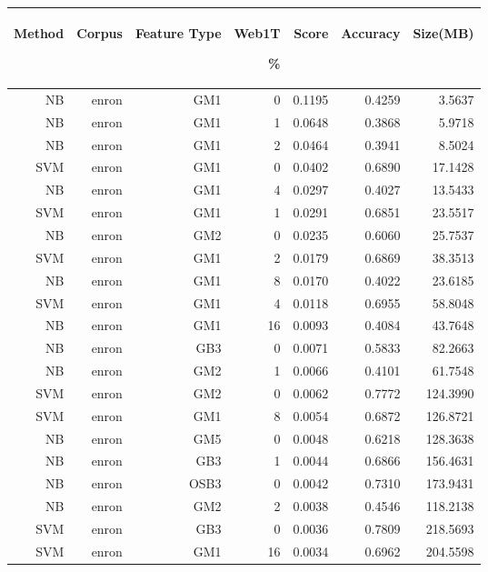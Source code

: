 \begin{table}[htbp!]
	\begin{center}
		\begin{tabular}{ | r | r | r | r | r | r | r | }
			\hline
			\begin{sideways}Method\end{sideways} & \begin{sideways}Corpus\end{sideways} & \begin{sideways}Feature Type\end{sideways} & \begin{sideways}Web1T\end{sideways} \% & \begin{sideways}Score\end{sideways} & \begin{sideways}Accuracy\end{sideways} & \begin{sideways}Size(MB)\end{sideways}\\ \hline 

			NB	& enron	& GM1	& 0	& 0.1195	& 0.4259	& 3.5637\\ \hline 
			NB	& enron	& GM1	& 1	& 0.0648	& 0.3868	& 5.9718\\ \hline 
			NB	& enron	& GM1	& 2	& 0.0464	& 0.3941	& 8.5024\\ \hline 
			SVM	& enron	& GM1	& 0	& 0.0402	& 0.6890	& 17.1428\\ \hline 
			NB	& enron	& GM1	& 4	& 0.0297	& 0.4027	& 13.5433\\ \hline 
			SVM	& enron	& GM1	& 1	& 0.0291	& 0.6851	& 23.5517\\ \hline 
			NB	& enron	& GM2	& 0	& 0.0235	& 0.6060	& 25.7537\\ \hline 
			SVM	& enron	& GM1	& 2	& 0.0179	& 0.6869	& 38.3513\\ \hline 
			NB	& enron	& GM1	& 8	& 0.0170	& 0.4022	& 23.6185\\ \hline 
			SVM	& enron	& GM1	& 4	& 0.0118	& 0.6955	& 58.8048\\ \hline 
			NB	& enron	& GM1	& 16	& 0.0093	& 0.4084	& 43.7648\\ \hline 
			NB	& enron	& GB3	& 0	& 0.0071	& 0.5833	& 82.2663\\ \hline 
			NB	& enron	& GM2	& 1	& 0.0066	& 0.4101	& 61.7548\\ \hline 
			SVM	& enron	& GM2	& 0	& 0.0062	& 0.7772	& 124.3990\\ \hline 
			SVM	& enron	& GM1	& 8	& 0.0054	& 0.6872	& 126.8721\\ \hline 
			NB	& enron	& GM5	& 0	& 0.0048	& 0.6218	& 128.3638\\ \hline 
			NB	& enron	& GB3	& 1	& 0.0044	& 0.6866	& 156.4631\\ \hline 
			NB	& enron	& OSB3	& 0	& 0.0042	& 0.7310	& 173.9431\\ \hline 
			NB	& enron	& GM2	& 2	& 0.0038	& 0.4546	& 118.2138\\ \hline 
			SVM	& enron	& GB3	& 0	& 0.0036	& 0.7809	& 218.5693\\ \hline 
			SVM	& enron	& GM1	& 16	& 0.0034	& 0.6962	& 204.5598\\ \hline


\end{tabular}
\end{center}
\end{table}
